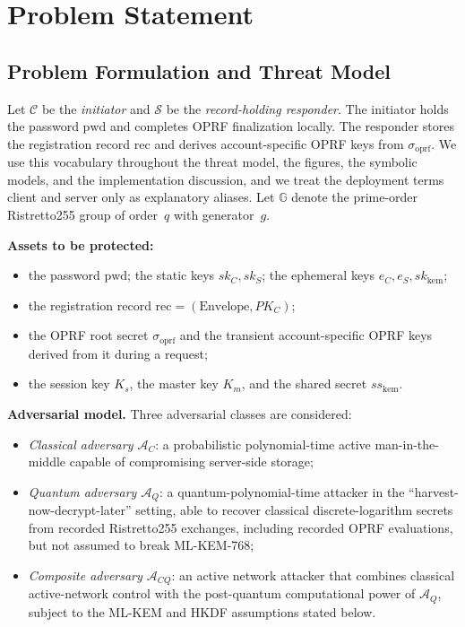 \documentclass{ieeeijc}
\newcommand{\sigoprf}{\sigma_{\mathrm{oprf}}}
\theoremstyle{remark}
\begin{document}
\section{Problem Statement}

\subsection{Problem Formulation and Threat Model}

Let $\mathcal{C}$ be the \emph{initiator} and $\mathcal{S}$ be the
\emph{record-holding responder}. The initiator holds the password
$\mathrm{pwd}$ and completes OPRF finalization locally. The responder
stores the registration record $\mathrm{rec}$ and derives
account-specific OPRF keys from $\sigoprf$. We use this vocabulary
throughout the threat model, the figures, the symbolic models, and the
implementation discussion, and we treat the deployment terms client and
server only as explanatory aliases. Let $\mathbb{G}$ denote the
prime-order Ristretto255 group of order~$q$ with generator~$g$.

\textbf{Assets to be protected:}
\begin{itemize}
  \item the password $\mathrm{pwd}$; the static keys $sk_C, sk_S$; the
        ephemeral keys $e_C, e_S, sk_{\mathrm{kem}}$;
  \item the registration record
        $\mathrm{rec} = (\mathrm{Envelope}, PK_C)$;
  \item the OPRF root secret $\sigoprf$ and the transient
        account-specific OPRF keys derived from it during a request;
  \item the session key $K_s$, the master key $K_m$, and the shared
        secret $ss_{\mathrm{kem}}$.
\end{itemize}

\textbf{Adversarial model.} Three adversarial classes are considered:
\begin{itemize}
  \item \emph{Classical adversary $\mathcal{A}_C$}: a
        probabilistic polynomial-time active man-in-the-middle capable
        of compromising server-side storage;
  \item \emph{Quantum adversary $\mathcal{A}_Q$}: a
        quantum-polynomial-time attacker in the
        ``harvest-now-decrypt-later'' setting, able to recover classical
        discrete-logarithm secrets from recorded Ristretto255 exchanges,
        including recorded OPRF evaluations, but not assumed to break
        ML-KEM-768;
  \item \emph{Composite adversary $\mathcal{A}_{CQ}$}: an active
        network attacker that combines classical active-network control
        with the post-quantum computational power of $\mathcal{A}_Q$,
        subject to the ML-KEM and HKDF assumptions stated below.
\end{itemize}
\end{document}
